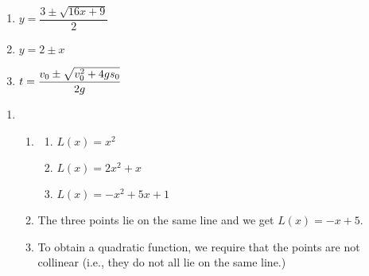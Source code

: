 \begin{multicols}{3}
\begin{enumerate}
\setcounter{enumi}{\value{HW}}


\item $y = \dfrac{3 \pm \sqrt{16x + 9}}{2}$ 
\item $y = 2 \pm x$ 
\item $t = \dfrac{v_{\mbox{\scriptsize $0$}} \pm \sqrt{v_{\mbox{\scriptsize $0$}}^{2} + 4gs_{\mbox{\scriptsize $0$}}}}{2g}  $

\setcounter{HW}{\value{enumi}}
\end{enumerate}
\end{multicols}

\begin{enumerate}
\setcounter{enumi}{\value{HW}}

\item
\begin{enumerate}

\item \begin{multicols}{3}

\begin{enumerate}

\item   $L(x) = x^2$

\item   $L(x) = 2x^2+x$

\item  $L(x) = -x^2+5x+1$

\end{enumerate}

\end{multicols}

\addtocounter{enumii}{1}

\vspace{-.1in}

\item The three points lie on the same line and we get $L(x) = -x+5$.

\item  To obtain a quadratic function, we require that the points are not collinear (i.e., they do not all lie on the same line.)


\end{enumerate}

\setcounter{HW}{\value{enumi}}
\end{enumerate}

